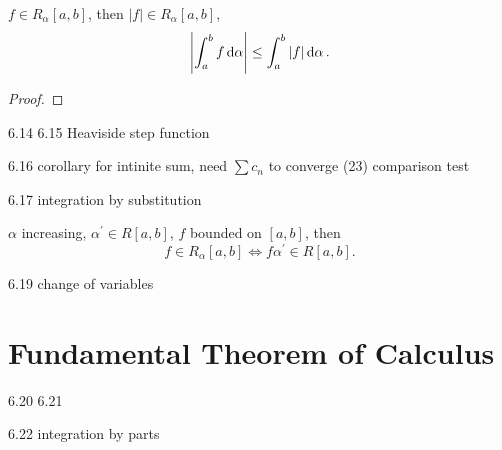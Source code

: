 \begin{theorem}
$f\in R_\alpha[a,b]$, then $|f|\in R_\alpha[a,b]$,
\[ \left|\int_a^bf\dd{\alpha}\right|\le\int_a^b|f|\dd{\alpha}. \]
\end{theorem}

\begin{proof}

\end{proof}

6.14 6.15
Heaviside step function

6.16 corollary
for intinite sum, need $\sum c_n$ to converge
(23) comparison test

6.17 integration by substitution
\begin{theorem}
$\alpha$ increasing, $\alpha^\prime\in R[a,b]$, $f$ bounded on $[a,b]$, then
\[ f\in R_\alpha[a,b]\iff f\alpha^\prime\in R[a,b]. \]
\end{theorem}

6.19 change of variables

\section{Fundamental Theorem of Calculus}
6.20 6.21

\begin{theorem}

\end{theorem}

6.22 integration by parts